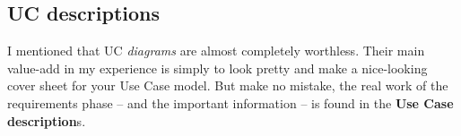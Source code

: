 \subsection{UC descriptions}

I mentioned that UC \textit{diagrams} are almost completely worthless. Their
main value-add in my experience is simply to look pretty and make a
nice-looking cover sheet for your Use Case model. But make no mistake, the
real work of the requirements phase -- and the important information -- is
found in the \textbf{Use Case description}s.




